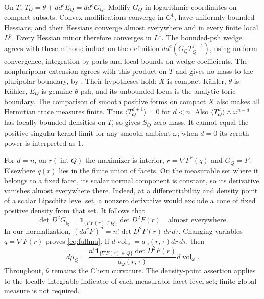 \documentclass[11pt]{article}
\newcommand{\ddc}{dd^c}
\newcommand{\vol}{\operatorname{vol}}
\newcommand{\NP}[1]{\langle #1\rangle}
\begin{document}
On $T$, $T_Q=\theta+\ddc E_Q=\ddc G_Q$. Mollify $G_Q$ in
logarithmic coordinates on compact subsets. Convex mollifications
converge in $C^1$, have uniformly bounded Hessians, and their Hessians
converge almost everywhere and in every finite local $L^p$.
Every Hessian minor therefore converges in $L^1$. The bounded-psh
wedge agrees with these minors: induct on the definition
$\ddc(G_Q T_Q^{j-1})$, using uniform convergence, integration by
parts and local bounds on wedge coefficients. The nonpluripolar
extension agrees with this product on $T$ and gives no mass to the
pluripolar boundary, by \cite[Section 1.2, Proposition 1.6 and
Theorem 1.8]{BEGZ}. Their hypotheses hold: $X$ is compact K\"ahler,
$\theta$ is K\"ahler, $E_Q$ is genuine $\theta$-psh, and its unbounded
locus is the analytic toric boundary. The comparison of smooth positive
forms on compact $X$ also makes all Hermitian trace measures finite.
Thus $\NP{T_Q^{d+1}}=0$ for $d<n$.
Also $\NP{T_Q^d}\wedge\omega^{n-d}$ has locally bounded densities
on $T$, so gives $S_Q$ zero mass. It cannot equal the positive singular
kernel limit for any smooth ambient $\omega$; when $d=0$ its zeroth
power is interpreted as $1$.

For $d=n$, on $r(\operatorname{int}Q)$ the maximizer is interior,
$r=\nabla F^*(q)$ and $G_Q=F$. Elsewhere $q(r)$ lies in the finite
union of facets. On the measurable set where it belongs to a fixed
facet, its scalar normal component is constant, so its derivative
vanishes almost everywhere there. Indeed, at a differentiability and
density point of a scalar Lipschitz level set, a nonzero derivative
would exclude a cone of fixed positive density from that set. It follows that
\[
 \det D^2G_Q=\boldsymbol1_{\{\nabla F(r)\in Q\}}
                          \det D^2F(r)\quad\text{almost everywhere}.
\]
In our normalization,
$(\ddc F)^n=n!\det D^2F(r)\,dr\,d\tau$.
Changing variables $q=\nabla F(r)$ proves \eqref{eq:fullma}.
If $d\vol_\omega=a_\omega(r,\tau)dr\,d\tau$, then
\[
 d\mu_Q=
 \frac{n!\boldsymbol1_{\{\nabla F(r)\in Q\}}\det D^2F(r)}
      {a_\omega(r,\tau)}d\vol_\omega.
\]
Throughout, $\theta$ remains the Chern curvature.
The density-point assertion applies \cite[Theorem 6.10]{Hunter} to
the locally integrable indicator of each measurable facet level set;
finite global measure is not required.
\end{document}
